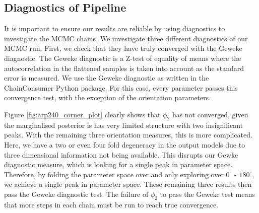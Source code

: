 \subsection{Diagnostics of Pipeline}
\noindent It is important to ensure our results are reliable by using diagnostics to investigate the MCMC chains. We investigate three different diagnostics of our MCMC run. First, we check that they have truly converged with the Geweke diagnostic. The Geweke diagnostic is a Z-test of equality of means where the autocorrelation in the flattened samples is taken into account as the standard error is measured. We use the Geweke diagnostic as written in the ChainConsumer \citep{Hinton2016} Python package. For this case, every parameter passes this convergence test, with the exception of the orientation parameters.

Figure \ref{fig:arp240_corner_plot} clearly shows that $\phi_{2}$ has not converged, given the marginalised posterior is has very limited structure with two insignificant peaks. With the remaining three orientation measures, this is more complicated. Here, we have a two or even four fold degeneracy in the output models due to three dimensional information not being available. This disrupts our Gewke diagnostic measure, which is looking for a single peak in parameter space. Therefore, by folding the parameter space over and only exploring over $0^{\circ}$ - $180^{\circ}$, we achieve a single peak in parameter space. These remaining three results then pass the Geweke diagnostic test. The failure of $\phi_{2}$ to pass the Geweke test means that more steps in each chain must be run to reach true convergence.

